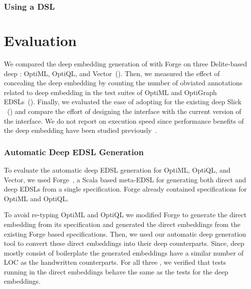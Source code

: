 \subsection{Using a \yy DSL}
\label{sec:using-a-dsl}




\chapter{Evaluation}
\label{sec:ch2-evaluation}

We compared the deep embedding generation of \yy with Forge on three Delite-based
 deep \edsls: OptiML, OptiQL, and Vector~().
Then, we measured the effect of concealing the deep embedding by counting the
number of obviated annotations related to deep embedding in the test suites of OptiML
and OptiGraph EDSLs~(). Finally, we evaluated the ease
of adopting \yy for the existing deep \edsl Slick~\cite{slick}
~() and compare the effort of designing the interface with
the current version of the interface. We do not report on execution speed since performance
benefits of the deep embedding have been studied previously~\cite{rompf_optimizing_2013,forge}.

\subsection{Automatic Deep EDSL Generation}
\label{subsec:eval-deepgen}

To evaluate the automatic deep EDSL generation for OptiML, OptiQL, and Vector,
we used Forge~\cite{forge}, a Scala based meta-EDSL for generating both direct
and deep EDSLs from a single specification. Forge already contained
specifications for OptiML and OptiQL.

To avoid re-typing OptiML and OptiQL we modified Forge to generate the direct
embedding from its specification and generated the direct embeddings
from the existing Forge based \edsl specifications. Then, we used our automatic deep
generation tool to convert these direct embeddings into their deep
counterparts. Since, deep \edsls mostly consist of boilerplate the generated
embeddings have a similar number of LOC as the handwritten counterparts. For all
three \edsls, we verified that tests running in the direct embeddings behave the
same as the tests for the deep embeddings.

